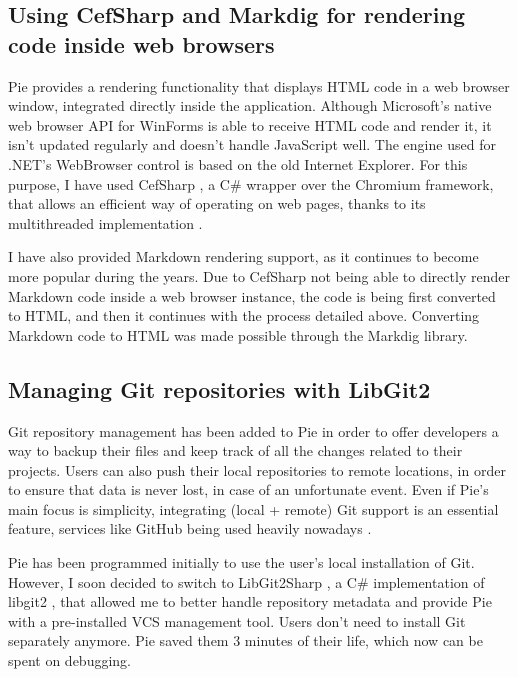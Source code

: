 \subsection{Using CefSharp and Markdig for rendering code inside web browsers}

Pie provides a rendering functionality that displays HTML code in a web browser window, integrated directly inside the application. Although Microsoft's native web browser API for WinForms is able to receive HTML code and render it, it isn't updated regularly and doesn't handle JavaScript well. The engine used for .NET's WebBrowser control is based on the old Internet Explorer. For this purpose, I have used CefSharp \cite{cefsharp}, a C\# wrapper over the Chromium framework, that allows an efficient way of operating on web pages, thanks to its multithreaded implementation \cite{mohamed2022performance}.

I have also provided Markdown rendering support, as it continues to become more popular during the years. Due to CefSharp not being able to directly render Markdown code inside a web browser instance, the code is being first converted to HTML, and then it continues with the process detailed above. Converting Markdown code to HTML was made possible through the Markdig \cite{markdig} library.

\subsection{Managing Git repositories with LibGit2}

Git repository management has been added to Pie in order to offer developers a way to backup their files \cite{git} and keep track of all the changes related to their projects. Users can also push their local repositories to remote locations, in order to ensure that data is never lost, in case of an unfortunate event. Even if Pie's main focus is simplicity, integrating (local + remote) Git support is an essential feature, services like GitHub being used heavily nowadays \cite{github-usage}.

Pie has been programmed initially to use the user's local installation of Git. However, I soon decided to switch to LibGit2Sharp \cite{libgit2sharp}, a C\# implementation of libgit2 \cite{libgit2}, that allowed me to better handle repository metadata and provide Pie with a pre-installed VCS management tool. Users don't need to install Git separately anymore. Pie saved them 3 minutes of their life, which now can be spent on debugging.

